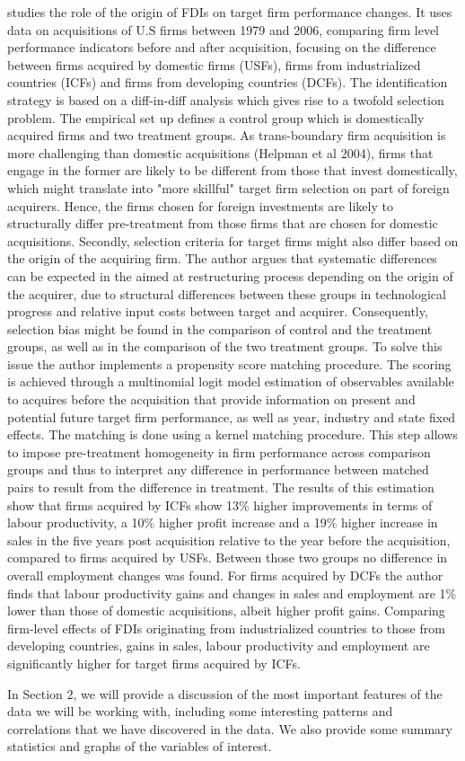 \cite{chen2011} studies the role of the origin of FDIs on target firm performance changes. It uses data on acquisitions of U.S firms between 1979 and 2006, comparing firm level performance indicators before and after acquisition, focusing on the difference between firms acquired by domestic firms (USFs), firms from industrialized countries (ICFs) and firms from developing countries (DCFs). The identification strategy is based on a diff-in-diff analysis which gives rise to a twofold selection problem. The empirical set up defines a control group which is domestically acquired firms and two treatment groups. As trans-boundary firm acquisition is more challenging than domestic acquisitions (Helpman et al 2004), firms that engage in the former are likely to be different from those that invest domestically, which might translate into "more skillful" target firm selection on part of foreign acquirers. Hence, the firms chosen for foreign investments are likely to structurally differ pre-treatment from those firms that are chosen for domestic acquisitions. Secondly, selection criteria for target firms might also differ based on the origin of the acquiring firm. The author argues that systematic differences can be expected in the aimed at restructuring process depending on the origin of the acquirer, due to structural differences between these groups in technological progress and relative input costs between target and acquirer. Consequently, selection bias might be found in the comparison of control and the treatment groups, as well as in the comparison of the two treatment groups. To solve this issue the author implements a propensity score matching procedure. The scoring is achieved through a multinomial logit model estimation of observables available to acquires before the acquisition that provide information on present and potential future target firm performance, as well as year, industry and state fixed effects. The matching is done using a kernel matching procedure. This step allows to impose pre-treatment homogeneity in firm performance across comparison groups and thus to interpret any difference in performance between matched pairs to result from the difference in treatment. The results of this estimation show that firms acquired by ICFs show 13\% higher improvements in terms of labour productivity, a 10\% higher profit increase and a 19\% higher increase in sales in the five years post acquisition relative to the year before the acquisition, compared to firms acquired by USFs. Between those two groups no difference in overall employment changes was found. For firms acquired by DCFs the author finds that labour productivity gains and changes in sales and employment are 1\% lower than those of domestic acquisitions, albeit higher profit gains. Comparing firm-level effects of FDIs originating from industrialized countries to those from developing countries, gains in sales, labour productivity and employment are significantly higher for target firms acquired by ICFs. \\ \par

In Section $2$, we will provide a discussion of the most important features of the data we will be working with, including some interesting patterns and correlations that we have discovered in the data. We also provide some summary statistics and graphs of the variables of interest.
